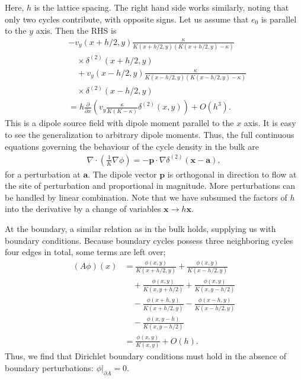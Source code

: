 \documentclass[10pt,aps,pra,twocolumn,superscriptaddress]{revtex4-1}
\renewcommand{\vec}[1]{\boldsymbol{#1}}
\begin{document}
Here, $h$ is the lattice spacing.
The right hand side works similarly, noting that only two cycles
contribute, with opposite signs. Let us assume that $e_0$ is
parallel to the $y$ axis. Then the RHS is
\begin{align}
    &- v_y(x+h/2,y) \frac{\kappa}{K(x+h/2,y)(K(x+h/2,y)-\kappa)} \\
    &\quad \times \delta^{(2)}(x+h/2,y)
    \\
    &\quad+ v_y(x-h/2,y) \frac{\kappa}{K(x-h/2,y)(K(x-h/2,y)-\kappa)} \\
    &\quad\times \delta^{(2)}(x-h/2,y)
    \\
    &= h \frac{\partial}{\partial x} \left(v_y
    \frac{\kappa}{K(K-\kappa)}\delta^{(2)}(x,y)\right) + O(h^3).
\end{align}
This is a dipole source field with dipole moment parallel to the 
$x$ axis. It is easy to see the generalization to arbitrary dipole
moments. Thus, the full continuous equations governing the behaviour
of the cycle density in the bulk are
\begin{align}
 \nabla \cdot \left(\frac{1}{K} \nabla \phi\right) =
 -\vec p \cdot \nabla \delta^{(2)}(\vec x-\vec a),
 \label{eqn:dipole}
\end{align}
for a perturbation at $\vec a$. The dipole vector $\vec p$ is
orthogonal in direction to flow at the site of perturbation and
proportional in magnitude.
More perturbations can be handled
by linear combination. Note that we have subsumed
the factors of $h$ into the derivative by a change of variables
$\vec x \rightarrow h \vec x$.

At the boundary, a similar relation as in the bulk holds, supplying us
with boundary conditions.
Because boundary cycles
possess three neighboring cycles four edges in total, some
terms are left over;
\begin{align}
    (A\phi)(x) &= \frac{\phi(x,y)}{K(x + h/2,y)} 
    +\frac{\phi(x,y)}{K(x - h/2,y)} \\
    &\quad + \frac{\phi(x,y)}{K(x,y+h/2)}
    + \frac{\phi(x,y)}{K(x,y-h/2)} \\
    &\quad -\frac{\phi(x+h,y)}{K(x+h/2,y)}
    -\frac{\phi(x-h,y)}{K(x-h/2,y)} \\
    &\quad -\frac{\phi(x,y-h)}{K(x,y-h/2)} \\
    &= \frac{\phi(x,y)}{K(x,y)} + O(h).
\end{align}
Thus, we find that Dirichlet boundary conditions must hold in the absence
of boundary perturbations:
$\phi|_{\partial A} = 0$.
\end{document}
